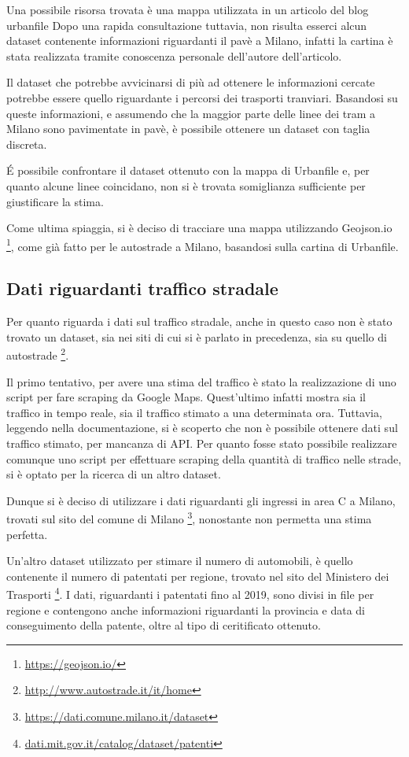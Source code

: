 \documentclass[a4paper]{report}
\begin{document}
Una possibile risorsa trovata è una mappa utilizzata in un articolo del blog urbanfile \cite{URBANFILE:1}
Dopo una rapida consultazione tuttavia, non risulta esserci alcun dataset contenente informazioni 
riguardanti il pavè a Milano, infatti la cartina è stata realizzata tramite conoscenza personale dell'autore dell'articolo.

Il dataset che potrebbe avvicinarsi di più ad ottenere le informazioni cercate potrebbe essere 
quello riguardante i percorsi dei trasporti tranviari. Basandosi su queste informazioni, e assumendo che 
la maggior parte delle linee dei tram a Milano sono pavimentate in pavè, è possibile ottenere un dataset con taglia discreta.

\'E possibile confrontare il dataset ottenuto con la mappa di Urbanfile e, 
per quanto alcune linee coincidano, non si è trovata somiglianza sufficiente 
per giustificare la stima.

Come ultima spiaggia, si è deciso di tracciare una mappa utilizzando Geojson.io
\footnote{\url{https://geojson.io/}}, come già fatto per le autostrade a Milano, 
basandosi sulla cartina di Urbanfile. 

\subsection{Dati riguardanti traffico stradale}
Per quanto riguarda i dati sul traffico stradale, anche in questo caso non è stato trovato un 
dataset, sia nei siti di cui si è parlato in precedenza, sia su quello di autostrade
\footnote{\url{http://www.autostrade.it/it/home}}.

Il primo tentativo, per avere una stima del traffico è stato la realizzazione di uno script per 
fare scraping da Google Maps. Quest'ultimo infatti mostra sia il traffico in tempo reale, sia 
il traffico stimato a una determinata ora. Tuttavia, leggendo nella documentazione, si è scoperto che 
non è possibile ottenere dati sul traffico stimato, per mancanza di API. 
Per quanto fosse stato possibile realizzare comunque uno script per effettuare scraping della 
quantità di traffico nelle strade, si è optato per la ricerca di un altro dataset.

Dunque si è deciso di utilizzare i dati riguardanti gli ingressi in area C a Milano, 
trovati sul sito del comune di Milano
\footnote{\url{https://dati.comune.milano.it/dataset}}, 
nonostante non permetta una stima perfetta.

Un'altro dataset utilizzato per stimare il numero di automobili, è quello contenente il numero di 
patentati per regione, trovato nel sito del Ministero dei Trasporti
\footnote{\url{dati.mit.gov.it/catalog/dataset/patenti}}.
I dati, riguardanti i patentati fino al 2019, sono divisi in file per regione e contengono anche 
informazioni riguardanti la provincia e data di conseguimento della patente, 
oltre al tipo di ceritificato ottenuto.
\end{document}

